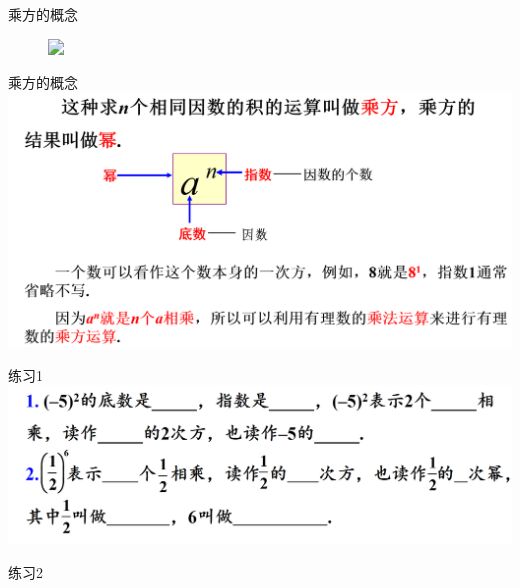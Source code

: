 \begin{frame}{乘方的概念}

    \begin{figure}
        \includegraphics<2>[width=.9\textwidth]{assets/14.png}
    \end{figure}
\end{frame}

\begin{frame}{乘方的概念}
    \includegraphics[width=.9\textwidth]{assets/15.png}
\end{frame}

\begin{frame}{练习1}
    \includegraphics[width=.9\textwidth]{assets/16.png}
\end{frame}

\begin{frame}{练习2}
\end{frame}

